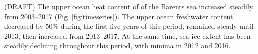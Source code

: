 \documentclass[draft]{agujournal2019}
\begin{document}




(DRAFT) The upper ocean heat content of of the Barents sea increased steadily from 2003--2017 (Fig~\ref{fig:timeseries}). The upper ocean freshwater content decreased by 50\% during the first five years of this period, remained steady until 2013, then increased from 2013--2017. At the same time, sea ice extent has been steadily declining throughout this period, with minima in 2012 and 2016.
\end{document}
